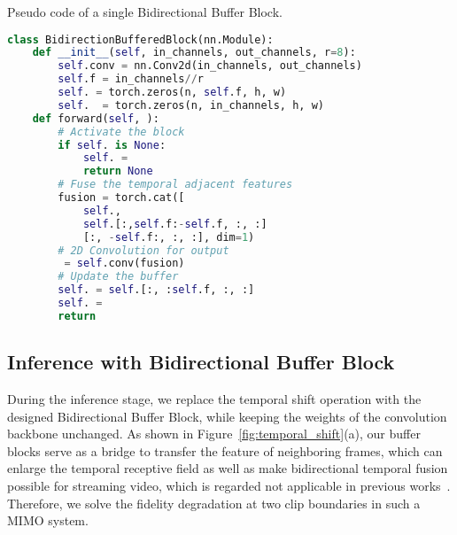 \documentclass[sigconf]{acmart}
\begin{document}
\begin{algorithm}[t]
\caption{\small{Pseudo code of a single Bidirectional Buffer Block.}}
\label{alg:pseudocode}
\vskip -0.075in
\begin{lstlisting}[language=python,mathescape=true]
class BidirectionBufferedBlock(nn.Module):
    def __init__(self, in_channels, out_channels, r=8):
        self.conv = nn.Conv2d(in_channels, out_channels)
        self.f = in_channels//r
        self. = torch.zeros(n, self.f, h, w)
        self.  = torch.zeros(n, in_channels, h, w)
    def forward(self, ):
        # Activate the block
        if self. is None: 
            self. = 
            return None
        # Fuse the temporal adjacent features
        fusion = torch.cat([
            self.,
            self.[:,self.f:-self.f, :, :]
            [:, -self.f:, :, :], dim=1)
        # 2D Convolution for output
         = self.conv(fusion)
        # Update the buffer
        self. = self.[:, :self.f, :, :]
        self. = 
        return 
\end{lstlisting}
\vspace{-6pt}
\end{algorithm}

\begin{table}[t]
\vspace{-25pt}
\end{table}

\subsection{Inference with Bidirectional Buffer Block }
\label{section:Bidirectional Buffer Block}
\label{section:Bidirectional Propagation Block}

During the inference stage, we replace the temporal shift operation with the designed Bidirectional Buffer Block, while keeping the weights of the convolution backbone unchanged.
As shown in Figure~\ref{fig:temporal_shift}(a), our buffer blocks serve as a bridge to transfer the feature of neighboring frames, which can enlarge the temporal receptive field as well as make bidirectional temporal fusion possible for streaming video, which is regarded not applicable in previous works~\cite{Lin2019TSM,Kondratyuk2021movinets}. Therefore, we solve the fidelity degradation at two clip boundaries in such a MIMO system.
\end{document}
